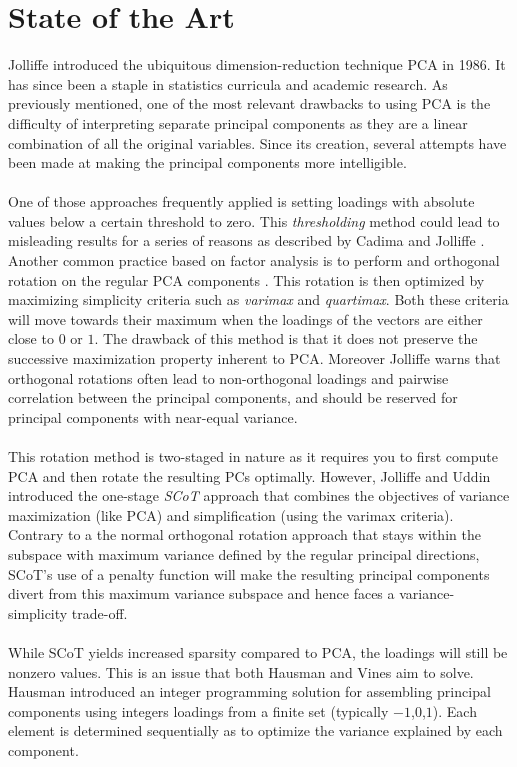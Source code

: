 \documentclass[12pt,letterpaper]{report}
\begin{document}
\section*{State of the Art}
Jolliffe \citeyear{Jolliffe1986} introduced the ubiquitous dimension-reduction technique PCA in 1986. It has since been a staple in statistics curricula and academic research. As previously mentioned, one of the most relevant drawbacks to using PCA is the difficulty of interpreting separate principal components as they are a linear combination of all the original variables. Since its creation, several attempts have been made at making the principal components more intelligible.\\
\\
One of those approaches frequently applied is setting loadings with absolute values below a certain threshold to zero. This \textit{thresholding} method could lead to misleading results for a series of reasons as described by Cadima and Jolliffe \citeyear{Cadima1995}.
Another common practice based on factor  analysis is to perform and orthogonal rotation on the regular PCA components \cite{Richman1986, Richman1987}. This rotation is then optimized by maximizing simplicity criteria such as \textit{varimax} and \textit{quartimax}. Both these criteria will move towards their maximum when the loadings of the vectors are either close to $0$ or $1$. The drawback of this method is that it does not preserve the successive maximization property inherent to PCA. Moreover Jolliffe \citeyear{Jolliffe1989, Jolliffe1995} warns that orthogonal rotations often lead to non-orthogonal loadings and pairwise correlation between the principal components, and should be reserved for principal components with near-equal variance.\\
\\
This rotation method is two-staged in nature as it requires you to first compute PCA and then rotate the resulting PCs optimally. However, Jolliffe and Uddin \citeyear{Jolliffe2000} introduced the one-stage \textit{SCoT} approach that combines the objectives of variance maximization (like PCA) and simplification (using the varimax criteria). Contrary to a the normal orthogonal rotation approach that stays within the subspace with maximum variance defined by the regular principal directions, SCoT's use of a penalty function will make the resulting principal components divert from this maximum variance subspace and hence faces a variance-simplicity trade-off.\\
\\
While SCoT yields increased sparsity compared to PCA, the loadings will still be nonzero values. This is an issue that both Hausman \citeyear{Hausman1982} and Vines \citeyear{Vines2000} aim to solve. Hausman introduced an integer programming solution for assembling principal components using integers loadings from a finite set (typically {$-1$,$0$,$1$}). Each element is determined sequentially as to optimize the variance explained by each component.\\ 
\end{document}
